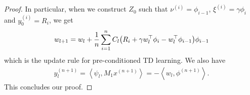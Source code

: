 \documentclass{article}
\newcommand{\indot}[2]{{\left<#1, #2\right>}}
\begin{document}
\begin{proof}
    In particular, when we construct $Z_0$ such that $\nu^{(i)} = \phi_{i-1}$, $\xi^{(i)} = \gamma \phi_i$ and $y_0^{(i)} = R_i$, 
    we get
    \begin{align}
        w_{l+1} = w_l + \frac{1}{n}\sum_{i=1}^n C_l \qty(R_i + \gamma w_l^\top \phi_i - w_l^\top \phi_{i-1}) \phi_{i-1}
    \end{align}
    which is the update rule for pre-conditioned TD learning.
    We also have
    \begin{align}
        y_l^{(n+1)}
        = \indot{\psi_l}{M_1 x^{(n+1)}} 
        = -\indot{w_l}{\phi^{(n+1)}}.
    \end{align}
    This concludes our proof.
    \end{proof}
\end{document}
